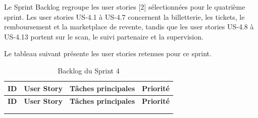 Le Sprint Backlog regroupe les user stories [2] sélectionnées pour le quatrième sprint. Les user stories US-4.1 à US-4.7 concernent la billetterie, les tickets, le remboursement et la marketplace de revente, tandis que les user stories US-4.8 à US-4.13 portent sur le scan, le suivi partenaire et la supervision.


Le tableau suivant présente les user stories retenues pour ce sprint.


{\footnotesize
\renewcommand{\arraystretch}{1.2}
\setlength{\tabcolsep}{4pt}
\begin{xltabular}{\textwidth}{|>{\centering\arraybackslash}p{1.4cm}|>{\raggedright\arraybackslash}X|>{\raggedright\arraybackslash}X|>{\centering\arraybackslash}p{1.8cm}|}
\caption{Backlog du Sprint 4}
\label{tableau:6-1}\\
\hline
{}
\textbf{ID} & \textbf{User Story} & \textbf{Tâches principales} & \textbf{Priorité} \\
\hline
\endfirsthead

\hline
{}
\textbf{ID} & \textbf{User Story} & \textbf{Tâches principales} & \textbf{Priorité} \\
\hline
\endhead

\hline
{} \\
\hline
\endfoot

\hline
\endlastfoot


\end{xltabular}}
